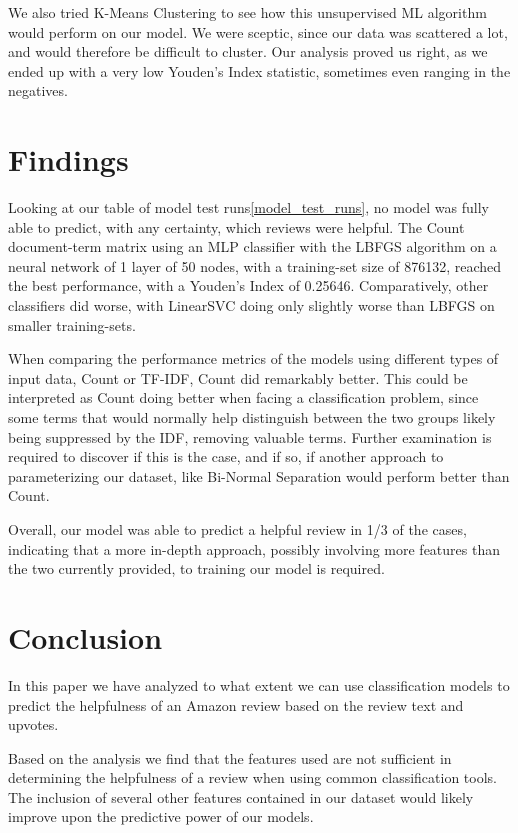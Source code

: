 \documentclass[twoside,twocolumn]{article}
\begin{document}
We also tried K-Means Clustering to see how this unsupervised ML algorithm would perform on our model. We were sceptic, since our data was scattered a lot, and would therefore be difficult to cluster. Our analysis proved us right, as we ended up with a very low Youden's Index statistic, sometimes even ranging in the negatives.


\section{Findings}

Looking at our table of model test runs\ref{model_test_runs}, no model was fully able to predict, with any certainty, which reviews were helpful. The Count document-term matrix using an MLP classifier with the LBFGS algorithm on a neural network of 1 layer of 50 nodes, with a training-set size of 876132, reached the best performance, with a Youden’s Index of 0.25646. Comparatively, other classifiers did worse, with LinearSVC doing only slightly worse than LBFGS on smaller training-sets.

When comparing the performance metrics of the models using different types of input data, Count or TF-IDF, Count did remarkably better. This could be interpreted as Count doing better when facing a classification problem, since some terms that would normally help distinguish between the two groups likely being suppressed by the IDF, removing valuable terms. Further examination is required to discover if this is the case, and if so, if another approach to parameterizing our dataset, like Bi-Normal Separation\cite{bi-normalSeparation} would perform better than Count.

Overall, our model was able to predict a helpful review in 1/3 of the cases, indicating that a more in-depth approach, possibly involving more features than the two currently provided, to training our model is required.

\section{Conclusion}
In this paper we have analyzed to what extent we can use classification models to predict the helpfulness of an Amazon review based on the review text and upvotes.

Based on the analysis we find that the features used are not sufficient in determining the helpfulness of a review when using common classification tools. The inclusion of several other features contained in our dataset would likely improve upon the predictive power of our models.
\end{document}

